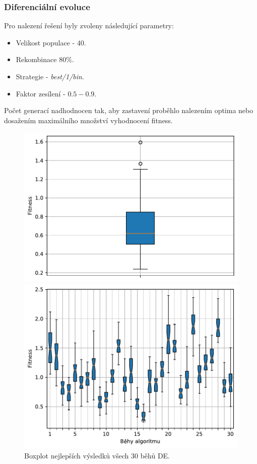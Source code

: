 \subsubsection{Diferenciální evoluce}
Pro nalezení řešení byly zvoleny následující parametry: 
\begin{itemize}
    \item Velikost populace - $40$.
    \item Rekombinace $80\%$.
    \item Strategie - \emph{best/1/bin}.
    \item Faktor zesílení - $0.5 - 0.9$.
\end{itemize}
Počet generací nadhodnocen tak, aby zastavení proběhlo nalezením optima nebo dosažením maximálního množství vyhodnocení fitness.

\begin{figure}[H]
\begin{minipage}[t]{0.475\linewidth}
\includegraphics[width=\linewidth]{obrazky-figures/statistics/Benchmarks/Ackley/DE/bestsBoxplot_WithOutliers.pdf}
\caption{Boxplot nejlepších výsledků všech $30$ běhů DE.}
\label{fg:bench:ackley:de:best}
\end{minipage}
\hfill
\begin{minipage}[t]{0.475\linewidth}
\includegraphics[width=\linewidth]{obrazky-figures/statistics/Benchmarks/Ackley/DE/lastGenBoxplots.pdf}

\end{minipage}
\end{figure}

